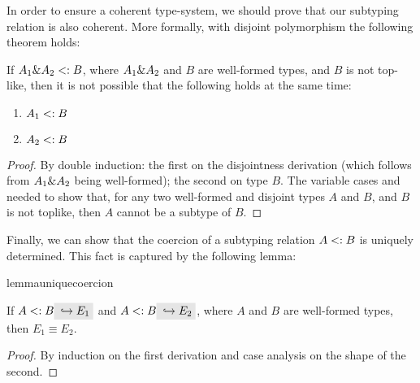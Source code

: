 In order to ensure a coherent type-system, we should prove that our subtyping relation is also 
coherent.
More formally, with disjoint polymorphism the following theorem holds:

\begin{lemma}
  \label{lemma:unique-subtype-contributor}

  If $A_1 \& A_2 <: B$, 
  where $A_1 \& A_2$ and $B$ are well-formed types, and
  $B$ is not top-like,
  then it is not possible that the following holds at the same time:
  \begin{enumerate}
    \item $A_1 <: B$
    \item $A_2 <: B$
  \end{enumerate}
\end{lemma}


\begin{proof}
By double induction: the first on the disjointness derivation (which follows from $A_1 \& A_2$ being well-formed);
the second on type $B$.
The variable cases  and  needed to show that, for any two well-formed 
and disjoint types $A$ and $B$, and $B$ is not toplike, then $A$ cannot be a subtype of $B$.
\end{proof}

Finally, we can show that the coercion of a subtyping relation $A <: B$ 
is uniquely determined.
This fact is captured by the following lemma:

\begin{restatable}{lemma}{uniquecoercion}
  \label{lemma:unique-coercion}

  If $A \subtype B \yields {E_1}$ and $A \subtype B \yields {E_2}$, where $A$
  and $B$ are well-formed types, then $E_1 \equiv E_2$.
\end{restatable}

\begin{proof}
By induction on the first derivation and case analysis  on the shape of the second. 
\end{proof}

